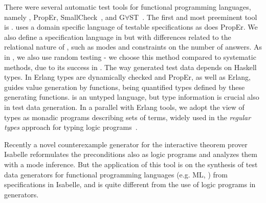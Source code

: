 There were several automatic test tools for functional programming
languages, namely \QuickCheck, {\sf PropEr}, {\sf SmallCheck}~\cite{runciman2008smallcheck},
and G$\forall$ST~\cite{koopman2003gast}.
The first and most preeminent tool is \QuickCheck{}.
\QuickCheck{} uses a domain specific language of testable specifications
as does {\sf PropEr}.
We also define a specification language in \plqc{} but with
differences related to the relational nature of \Prolog{}, such as modes
and constraints on the number of answers.
As in \QuickCheck{}, we also use random testing - we choose this method
compared to systematic methods, due to its success in \QuickCheck{}.
The way \QuickCheck{} generated test data depends on Haskell types.
In {\sf Erlang} types are dynamically checked and {\sf PropEr}, as well
as {\sf Erlang}\QuickCheck{}, guides value generation by functions,
being quantified types defined by these generating functions.
\Prolog{} is an untyped language, but type information is crucial also in
\plqc{} test data generation.
In a parallel with {\sf Erlang} tools, we adopt the view of types as
monadic \Prolog{} programs describing sets of terms, widely used in the
{\em regular types} approach for typing logic programs~\cite{Yardeni:1991:TSL:110703.110705,fruhwirth1991logic,DBLP:conf/iclp/Zobel87,florido1992types}.

  Recently a novel counterexample generator for the interactive theorem prover Isabelle \cite{bulwahn2012smart} reformulates the preconditions also as logic programs and analyzes them with a mode inference. But the application of this tool is on the  synthesis of test data generators for functional programming languages (e.g. ML, \Haskell) from specifications in Isabelle, and is quite different from the use of logic programs in \plqc{} generators.



